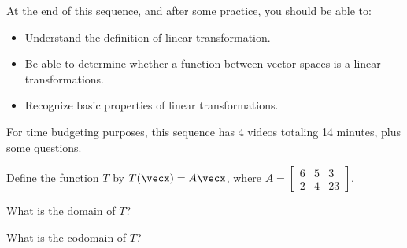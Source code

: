 




At the end of this sequence, and after some practice, you should be able to:

\begin{itemize}
\item Understand the definition of linear transformation.  
\item Be able to determine whether a function between vector spaces is a linear transformations. 
\item Recognize basic properties of linear transformations.
\end{itemize}

For time budgeting purposes, this sequence has 4 videos totaling 14 minutes, 
plus some questions.  



\endedxtext

\endedxvertical







Define the function $T$ by $T(\vecx) = A\vecx$, where $A = \left[ \begin{array}{ccc}
6 & 5 & 3 \\
2 & 4 &  23 
\end{array} \right].$

What is the domain of $T$?


What is the codomain of $T$?


\edXsolution{ 

}

\endedxproblem



\endedxvertical





